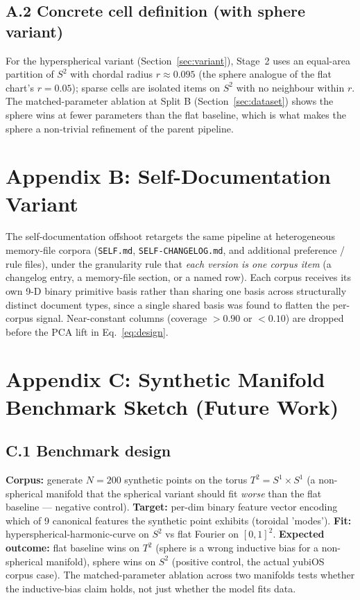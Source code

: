 \documentclass[11pt,a4paper]{article}
\begin{document}
\subsection{A.2 Concrete cell definition (with sphere variant)}
For the hyperspherical variant (Section~\ref{sec:variant}), Stage~2 uses an equal-area partition of $S^2$ with chordal radius $r \approx 0.095$ (the sphere analogue of the flat chart's $r = 0.05$); sparse cells are isolated items on $S^2$ with no neighbour within $r$. The matched-parameter ablation at Split B (Section~\ref{sec:dataset}) shows the sphere wins at fewer parameters than the flat baseline, which is what makes the sphere a non-trivial refinement of the parent pipeline.

\section{Appendix B: Self-Documentation Variant}
The self-documentation offshoot retargets the same pipeline at heterogeneous memory-file corpora (\texttt{SELF.md}, \texttt{SELF-CHANGELOG.md}, and additional preference / rule files), under the granularity rule that \emph{each version is one corpus item} (a changelog entry, a memory-file section, or a named row). Each corpus receives its own 9-D binary primitive basis rather than sharing one basis across structurally distinct document types, since a single shared basis was found to flatten the per-corpus signal. Near-constant columns (coverage $> 0.90$ or $< 0.10$) are dropped before the PCA lift in Eq.~\ref{eq:design}.

\section{Appendix C: Synthetic Manifold Benchmark Sketch (Future Work)}

\subsection{C.1 Benchmark design}
\textbf{Corpus:} generate $N = 200$ synthetic points on the torus $T^2 = S^1 \times S^1$ (a non-spherical manifold that the spherical variant should fit \emph{worse} than the flat baseline --- negative control).
\textbf{Target:} per-dim binary feature vector encoding which of 9 canonical features the synthetic point exhibits (toroidal 'modes').
\textbf{Fit:} hyperspherical-harmonic-curve on $S^2$ vs flat Fourier on $[0,1]^2$.
\textbf{Expected outcome:} flat baseline wins on $T^2$ (sphere is a wrong inductive bias for a non-spherical manifold), sphere wins on $S^2$ (positive control, the actual yubiOS corpus case). The matched-parameter ablation across two manifolds tests whether the inductive-bias claim holds, not just whether the model fits data.
\end{document}
